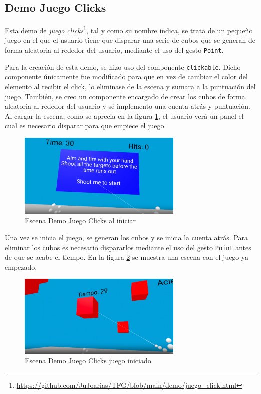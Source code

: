 \documentclass[a4paper, 12pt]{book}
\begin{document}
\subsection{Demo Juego Clicks}
\label{subsec:demo-juego}
Esta demo de \textit{juego clicks}\footnote{\url{https://github.com/JuJoarias/TFG/blob/main/demo/juego_click.html}}, tal y como su nombre indica, se trata de un pequeño juego en el que el usuario tiene que disparar una serie de cubos que se generan de forma aleatoria al rededor del usuario, mediante el uso del gesto \texttt{Point}. 

Para la creación de esta demo, se hizo uso del componente \texttt{clickable}. Dicho componente únicamente fue modificado para que en vez de cambiar el color del elemento al recibir el click, lo eliminase de la escena y sumara a la puntuación del juego. También, se creo un componente encargado de crear los cubos de forma aleatoria al rededor del usuario y sé 
implemento una cuenta atrás y puntuación. Al cargar la escena, como se aprecia en la figura \ref{fig:demo_juego_antes}, el usuario verá un panel el cual es necesario disparar para que empiece el juego.

\begin{figure}[H] 
  \centering
  \includegraphics[width=0.7\textwidth]{img/demo_juego_antes.png} 
  \caption{Escena Demo Juego Clicks al iniciar}
  \label{fig:demo_juego_antes}
\end{figure}

Una vez se inicia el juego, se generan los cubos y se inicia la cuenta atrás. Para eliminar los cubos es necesario dispararlos mediante el uso del gesto \texttt{Point} antes de que se acabe el tiempo. En la figura \ref{fig:demo_juego_despues} se muestra una escena con el juego ya empezado.

\begin{figure}[H] 
  \centering
  \includegraphics[width=0.7\textwidth]{img/demo_juego_despues.png} 
  \caption{Escena Demo Juego Clicks juego iniciado}
  \label{fig:demo_juego_despues}
\end{figure}
\end{document}
